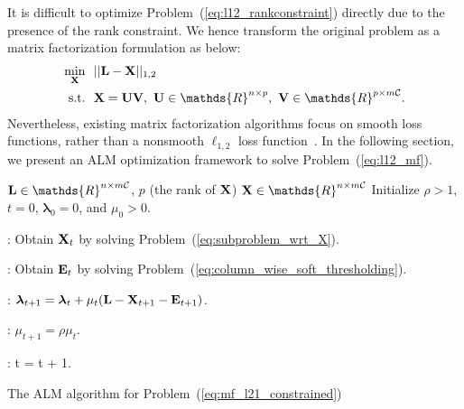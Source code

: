\documentclass[letterpaper]{article}
\def\bE{{\bf E}}
\def\blambda{{\bm \lambda}}
\def\calC{{\mathcal{C}}}
\def\bL{{\bf L}}
\def\bU{{\bf U}}
\def\bV{{\bf V}}
\def\dsR{\mathds{R}}
\def\bX{{\bf X}}
\def\bX{{\bf X}}
\def\st{{\text{s.t.}}}
\begin{document}
It is difficult to optimize Problem~(\ref{eq:l12_rankconstraint}) directly due to the presence of the rank constraint.
We hence transform the original problem as a matrix factorization formulation as below:
\begin{align}\label{eq:l12_mf}
  \min_{\bX} ~&~ || \bL - \bX ||_{1,2}   \nonumber \\
         \st ~&~ \bX = \bU \bV,~\bU \in \dsR^{n \times p},~\bV \in \dsR^{p \times m\calC}  .
\end{align}
\noindent
Nevertheless, existing matrix factorization algorithms focus on smooth loss functions, rather than a nonsmooth $\ell_{1,2}$ loss function~\cite{tanicml2014riemannian,vandereycken2013lowrank,Wen2012,ngonips2012scaled,rtrmc2011boumal}.
In the following section, we present an ALM optimization framework to solve Problem~(\ref{eq:l12_mf}).


\begin{small}
\begin{algorithm}[h!]

\begin{algorithmic}

\REQUIRE $\bL \in \dsR^{n \times m\calC}$, $p$ (the rank of $\bX$)
\ENSURE $\bX \in \dsR^{n \times m\calC}$
\STATE Initialize $\rho > 1$, $t = 0$, $\blambda_{0} = 0$, and $\mu_{0} > 0$.



    : Obtain $\bX_{t}$ by solving Problem~(\ref{eq:subproblem_wrt_X}).

    : Obtain $\bE_{t}$ by solving Problem~(\ref{eq:column_wise_soft_thresholding}).

  \ENDWHILE

  : $\blambda_{t+1} = \blambda_{t} + \mu_{t} (\bL - \bX_{t+1} - \bE_{t+1})$.

  : $\mu_{t+1} = \rho \mu_{t}$.

  : t = t + 1.

\ENDWHILE

\end{algorithmic}
\caption{The ALM algorithm for Problem~(\ref{eq:mf_l21_constrained})}
\label{alg:alm_mf}
\end{algorithm}
\end{small}
\end{document}
